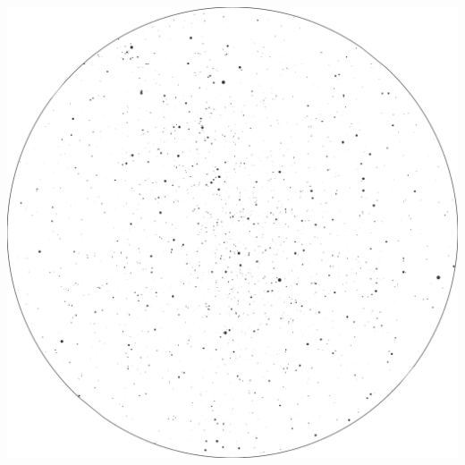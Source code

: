 \documentclass{./SAS-class-skygen}
\begin{document}
	\vspace{0.5cm}
    \begin{center}
    \includegraphics[width=\textwidth]{./pics/skychart59.png}
    \end{center}
    
    
\end{document}
